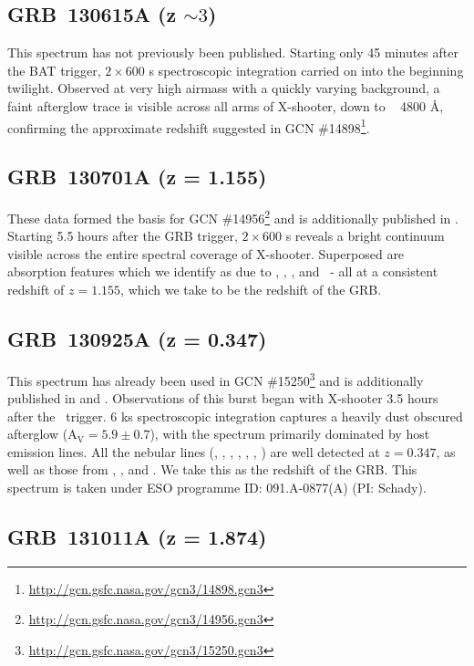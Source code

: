 \documentclass{aa}    %
\begin{document}
\subsection{GRB~130615A (z $\sim 3$)}

This spectrum has not previously been published. Starting only 45 minutes after
the BAT trigger, $2\times600$ s spectroscopic integration carried on into the
beginning twilight. Observed at very high airmass with a quickly varying
background, a faint afterglow trace is visible across all arms of X-shooter,
down to ~ 4800 \AA, confirming the approximate redshift suggested in GCN
\#14898\footnote{\url{http://gcn.gsfc.nasa.gov/gcn3/14898.gcn3}}.


\subsection{GRB~130701A (z = 1.155)}	

These data formed the basis for GCN
\#14956\footnote{\url{http://gcn.gsfc.nasa.gov/gcn3/14956.gcn3}} and is
additionally published in \citet{Kruhler2015}. Starting 5.5 hours after the GRB
trigger, $2\times600$ s reveals a bright continuum visible across the entire
spectral coverage of X-shooter. Superposed are absorption features which we
identify as due to \feii, \mgii, \mgi, and \caii~- all at a consistent redshift
of $z = 1.155$, which we take to be the redshift of the GRB.



\subsection{GRB~130925A (z = 0.347)}

This spectrum has already been used in GCN
\#15250\footnote{\url{http://gcn.gsfc.nasa.gov/gcn3/15250.gcn3}} and is
additionally published in \citet{Schady2015} and \citet{Kruhler2015}.
Observations of this burst began with X-shooter 3.5 hours after the
\swift~trigger. 6 ks spectroscopic integration captures a heavily dust obscured
afterglow (A$_\mathrm{V} = 5.9 \pm 0.7$\citep{Greiner2014}), with the spectrum
primarily dominated by host emission lines. All the nebular lines (\oii, \hg,
\hb, \oii, \ha, \nii, \sii) are well detected at $z = 0.347$, as well as those
from \pad, \pag, and \pab. We take this as the redshift of the GRB. This
spectrum is taken under ESO programme ID: 091.A-0877(A) (PI: Schady).

\subsection{GRB~131011A (z = 1.874)}	
\end{document}
